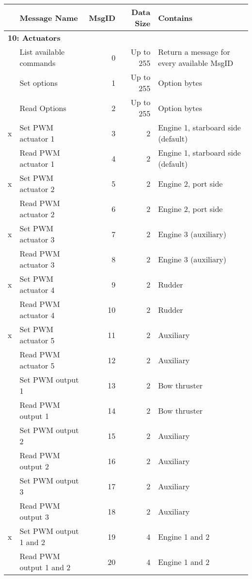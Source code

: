 \begin{sidewaystable}[h]
\centering
	\begin{tabular}{llrrl}
	\toprule
	& \textbf{Message Name} & \textbf{MsgID} & \textbf{Data Size} & \textbf{Contains}\\
	\midrule
	\multicolumn{5}{l}{\textbf{10: Actuators}}\\
	\midrule
	& List available commands & 0 & Up to 255 & Return a message for every available MsgID\\
	& Set options & 1 & Up to 255 & Option bytes\\
	& Read Options & 2 & Up to 255 & Option bytes\\
	x& Set PWM actuator 1  & 3 & 2 & Engine 1, starboard side (default)\\
	& Read PWM actuator 1 & 4 & 2 & Engine 1, starboard side (default)\\
	x& Set PWM actuator 2 & 5 & 2 & Engine 2, port side\\
	& Read PWM actuator 2 & 6 & 2 & Engine 2, port side\\
	x& Set PWM actuator 3 & 7 & 2 & Engine 3 (auxiliary)\\
	& Read PWM actuator 3 & 8 & 2 & Engine 3 (auxiliary)\\ 
	x& Set PWM actuator 4 & 9 & 2 & Rudder\\
	& Read PWM actuator 4 & 10 & 2 & Rudder\\ 
	x& Set PWM actuator 5 & 11 & 2 & Auxiliary\\
	& Read PWM actuator 5 & 12 & 2 & Auxiliary\\ 
	& Set PWM output 1 & 13 & 2 & Bow thruster\\
	& Read PWM output 1 & 14 & 2 & Bow thruster\\ 
	& Set PWM output 2 & 15 & 2 & Auxiliary\\
	& Read PWM output 2 & 16 & 2 & Auxiliary\\ 
	& Set PWM output 3 & 17 & 2 & Auxiliary\\
	& Read PWM output 3 & 18 & 2 & Auxiliary\\ 
	x& Set PWM output 1 and 2 & 19 & 4 & Engine 1 and 2\\
	& Read PWM output 1 and 2 & 20 & 4 & Engine 1 and 2\\ 
	\midrule
	\end{tabular}
\caption{}
\label{tab:msg2}
\end{sidewaystable}
\newpage

